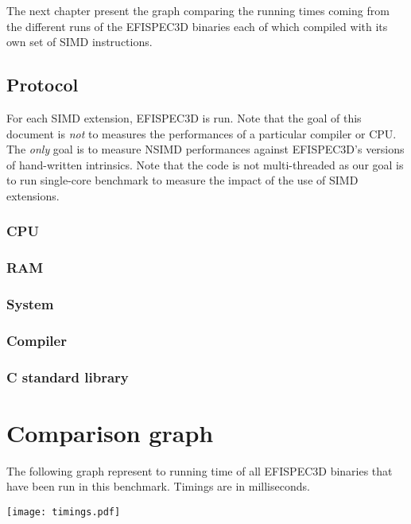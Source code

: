 \documentclass[a4paper,11pt]{article}
\newcommand{\efispec}{EFISPEC3D}
\begin{document}
The next chapter present the graph comparing the running times coming from
the different runs of the \efispec{} binaries each of which compiled with its
own set of SIMD instructions.

\subsection{Protocol}

For each SIMD extension, \efispec{} is run. Note that the goal of this document
is \emph{not} to measures the performances of a particular compiler or CPU. The
\emph{only} goal is to measure NSIMD performances against \efispec{}'s versions
of hand-written intrinsics. Note that the code is not multi-threaded as our
goal is to run single-core benchmark to measure the impact of the use of SIMD
extensions.

\subsubsection{CPU}


\subsubsection{RAM}


\subsubsection{System}


\subsubsection{Compiler}


\subsubsection{C standard library}

 
\newpage
\section{Comparison graph}

The following graph represent to running time of all \efispec{} binaries that
have been run in this benchmark. Timings are in milliseconds.

\begin{center}
  \texttt{[image: timings.pdf]}
\end{center}

\newpage


\end{document}

